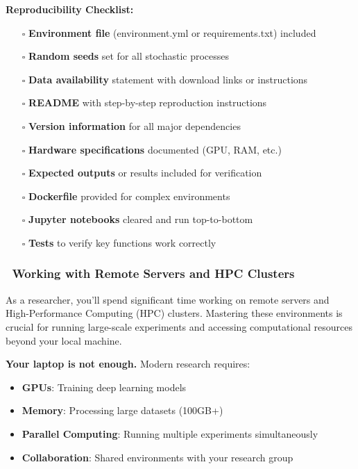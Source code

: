 \documentclass[11pt,a4paper]{article}
\begin{document}
\textbf{Reproducibility Checklist:}

\begin{tcolorbox}[colback=green!5,colframe=green!50,title={\faCheckCircle~Before Publishing Your Research}]
\begin{itemize}
    \item[$\square$] \textbf{Environment file} (environment.yml or requirements.txt) included
    \item[$\square$] \textbf{Random seeds} set for all stochastic processes
    \item[$\square$] \textbf{Data availability} statement with download links or instructions
    \item[$\square$] \textbf{README} with step-by-step reproduction instructions
    \item[$\square$] \textbf{Version information} for all major dependencies
    \item[$\square$] \textbf{Hardware specifications} documented (GPU, RAM, etc.)
    \item[$\square$] \textbf{Expected outputs} or results included for verification
    \item[$\square$] \textbf{Dockerfile} provided for complex environments
    \item[$\square$] \textbf{Jupyter notebooks} cleared and run top-to-bottom
    \item[$\square$] \textbf{Tests} to verify key functions work correctly
\end{itemize}
\end{tcolorbox}

\subsubsection{\faServer~Working with Remote Servers and HPC Clusters}

As a researcher, you'll spend significant time working on remote servers and High-Performance Computing (HPC) clusters. Mastering these environments is crucial for running large-scale experiments and accessing computational resources beyond your local machine.

\begin{tcolorbox}[colback=blue!5,colframe=blue!40,title={\faInfoCircle~Why Remote Servers Matter}]
\textbf{Your laptop is not enough.} Modern research requires:
\begin{itemize}
    \item \textbf{GPUs}: Training deep learning models
    \item \textbf{Memory}: Processing large datasets (100GB+)
    \item \textbf{Parallel Computing}: Running multiple experiments simultaneously
    \item \textbf{Collaboration}: Shared environments with your research group
\end{itemize}
\end{tcolorbox}
\end{document}
